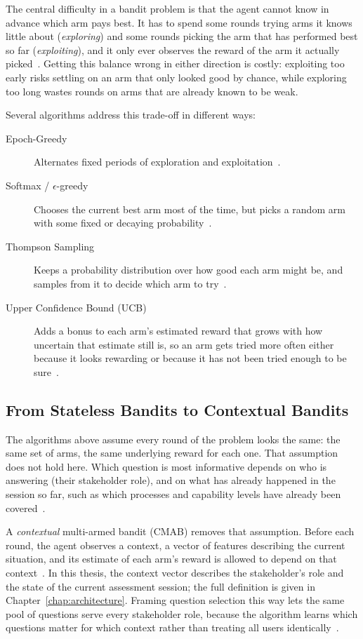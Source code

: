 \documentclass[a4paper, 12pt, oneside, openany, BCOR1cm,toc=chapterentrywithdots]{scrbook}
\begin{document}
The central difficulty in a bandit problem is that the agent cannot know in advance which arm
pays best. It has to spend some rounds trying arms it knows little about
(\emph{exploring}) and some rounds picking the arm that has performed best so far
(\emph{exploiting}), and it only ever observes the reward of the arm it actually
picked~\cite{datsogiannis2024early,naeem2020gentleintro}. Getting this balance wrong in either
direction is costly: exploiting too early risks settling on an arm that only looked good by
chance, while exploring too long wastes rounds on arms that are already known to be weak.

Several algorithms address this trade-off in different ways:

\begin{description}
  \item[Epoch-Greedy] Alternates fixed periods of exploration and
  exploitation~\cite{langford2007epochgreedy}.
  \item[Softmax / $\epsilon$-greedy] Chooses the current best arm most of the time, but picks a
  random arm with some fixed or decaying probability~\cite{tokic2011valuedifference}.
  \item[Thompson Sampling] Keeps a probability distribution over how good each arm might be, and
  samples from it to decide which arm to try~\cite{agrawal2013thompson}.
  \item[Upper Confidence Bound (UCB)] Adds a bonus to each arm's estimated reward that grows with
  how uncertain that estimate still is, so an arm gets tried more often either because it looks
  rewarding or because it has not been tried enough to be sure~\cite{auer2002confidence}.
\end{description}

\subsection{From Stateless Bandits to Contextual Bandits}

The algorithms above assume every round of the problem looks the same: the same set of arms, the
same underlying reward for each one. That assumption does not hold here. Which question is most
informative depends on who is answering (their stakeholder role), and on what has already
happened in the session so far, such as which processes and capability levels have already been
covered~\cite{datsogiannis2024early}.

A \emph{contextual} multi-armed bandit (CMAB) removes that assumption. Before each round, the
agent observes a context, a vector of features describing the current situation, and its estimate
of each arm's reward is allowed to depend on that context~\cite{li2010contextual}. In this
thesis, the context vector describes the stakeholder's role and the state of the current
assessment session; the full definition is given in Chapter~\ref{chap:architecture}. Framing
question selection this way lets the same pool of questions serve every stakeholder role,
because the algorithm learns which questions matter for which context rather than treating all
users identically~\cite{gutowski2018contextenhancement}.
\end{document}
